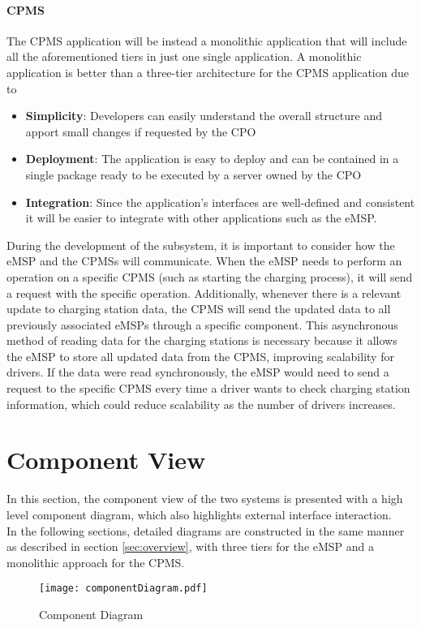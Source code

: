 \paragraph{CPMS}
The CPMS application will be instead a monolithic application that will include all the aforementioned tiers in just one single application. A monolithic application is better than a three-tier architecture for the CPMS application due to
\begin{itemize}
    \item \textbf{Simplicity}: Developers can easily understand the overall structure and apport small changes if requested by the CPO
    \item \textbf{Deployment}: The application is easy to deploy and can be contained in a single package ready to be executed by a server owned by the CPO
    \item \textbf{Integration}: Since the application's interfaces are well-defined and consistent it will be easier to integrate with other applications such as the eMSP.
\end{itemize}
During the development of the subsystem, it is important to consider how the eMSP and the CPMSs will communicate. When the eMSP needs to perform an operation on a specific CPMS (such as starting the charging process), it will send a request with the specific operation. Additionally, whenever there is a relevant update to charging station data, the CPMS will send the updated data to all previously associated eMSPs through a specific component. This asynchronous method of reading data for the charging stations is necessary because it allows the eMSP to store all updated data from the CPMS, improving scalability for drivers. If the data were read synchronously, the eMSP would need to send a request to the specific CPMS every time a driver wants to check charging station information, which could reduce scalability as the number of drivers increases.
\section{Component View} %
\label{sec:componentView}
In this section, the component view of the two systems is presented with a high level component diagram, which also highlights external interface interaction. \\%
In the following sections, detailed diagrams are constructed in the same manner as described in section \ref{sec:overview}, with three tiers for the eMSP and a monolithic approach for the CPMS.
\begin{figure}[H]
            \begin{center}
            \texttt{[image: componentDiagram.pdf]}
            \caption{Component Diagram}
            \label{fig:ComponentDiagram}
            \end{center}
        \end{figure}
\restoregeometry        
